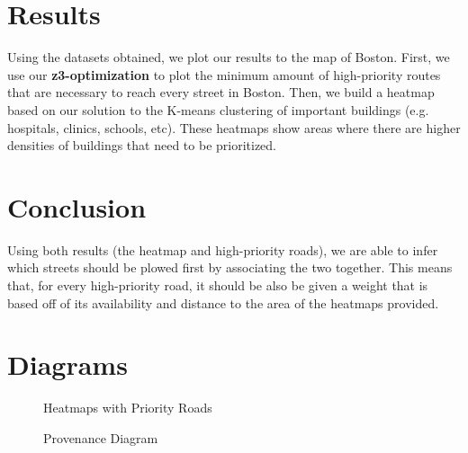 \documentclass[15pt]{report}
\begin{document}
\section*{Results}
Using the datasets obtained, we plot our results to the map of Boston. First, we use our \textbf{z3-optimization} to plot the minimum amount of high-priority routes that are necessary to reach every street in Boston. Then, we build a heatmap based on our solution to the K-means clustering of important buildings (e.g. hospitals, clinics, schools, etc). These heatmaps show areas where there are higher densities of buildings that need to be prioritized. 

\section*{Conclusion}
Using both results (the heatmap and high-priority roads), we are able to infer which streets should be plowed first by associating the two together. This means that, for every high-priority road, it should be also be given a weight that is based off of its availability and distance to the area of the heatmaps provided. 

\section*{Diagrams}
\begin{figure}[h!]
	\centering
	\caption{Heatmaps with Priority Roads}
	\label{fig:method}
\end{figure}
\begin{figure}[h!]
	\centering
	\caption{Provenance Diagram}
	\label{fig:method}
\end{figure}
\end{document}
